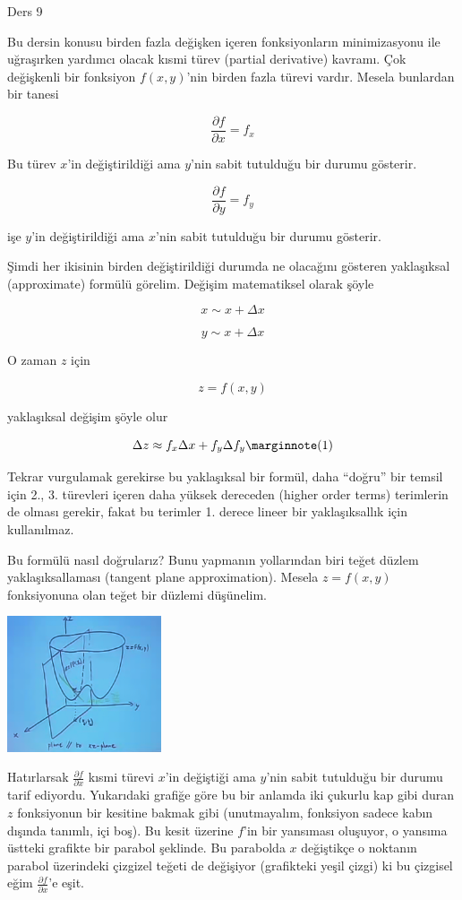 \documentclass[12pt,fleqn]{article}\usepackage{../../common}
\begin{document}
Ders 9

Bu dersin konusu birden fazla değişken içeren fonksiyonların minimizasyonu ile
uğraşırken yardımcı olacak kısmi türev (partial derivative) kavramı. Çok
değişkenli bir fonksiyon $f(x,y)$'nin birden fazla türevi vardır. Mesela
bunlardan bir tanesi

$$ \frac{\partial f}{\partial x} = f_x $$

Bu türev $x$'in değiştirildiği ama $y$'nin sabit tutulduğu bir durumu
gösterir. 

$$ \frac{\partial f}{\partial y} = f_y $$

işe $y$'in değiştirildiği ama $x$'nin sabit tutulduğu bir durumu gösterir.

Şimdi her ikisinin birden değiştirildiği durumda ne olacağını gösteren
yaklaşıksal (approximate) formülü görelim. Değişim matematiksel olarak şöyle

$$ x \sim x + \Delta x $$

$$ y \sim x + \Delta x $$

O zaman $z$ için

$$ z = f(x,y) $$

yaklaşıksal değişim şöyle olur

$$
\Delta z \approx f_x\Delta x + f_y \Delta f_y
\mlabel{1}
$$

Tekrar vurgulamak gerekirse bu yaklaşıksal bir formül, daha ``doğru'' bir temsil
için 2., 3. türevleri içeren daha yüksek dereceden (higher order terms)
terimlerin de olması gerekir, fakat bu terimler 1. derece lineer bir
yaklaşıksallık için kullanılmaz.

Bu formülü nasıl doğrularız? Bunu yapmanın yollarından biri teğet düzlem
yaklaşıksallaması (tangent plane approximation). Mesela $z = f(x,y)$
fonksiyonuna olan teğet bir düzlemi düşünelim.

\begin{center}
\includegraphics[height=4cm]{9_1.png}
\end{center}

Hatırlarsak $\frac{\partial f}{\partial x}$ kısmi türevi $x$'in değiştiği ama
$y$'nin sabit tutulduğu bir durumu tarif ediyordu. Yukarıdaki grafiğe göre bu
bir anlamda iki çukurlu kap gibi duran $z$ fonksiyonun bir kesitine bakmak gibi
(unutmayalım, fonksiyon sadece kabın dışında tanımlı, içi boş). Bu kesit üzerine
$f$'in bir yansıması oluşuyor, o yansıma üstteki grafikte bir parabol
şeklinde. Bu parabolda $x$ değiştikçe o noktanın parabol üzerindeki çizgizel
teğeti de değişiyor (grafikteki yeşil çizgi) ki bu çizgisel eğim
$\frac{\partial f}{\partial x}$'e eşit.
\end{document}
